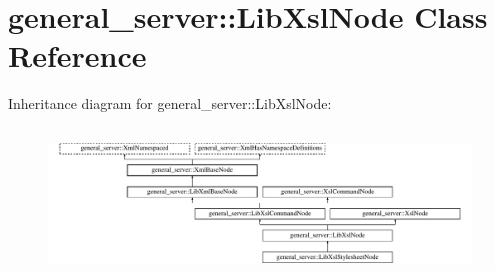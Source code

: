 \hypertarget{classgeneral__server_1_1LibXslNode}{\section{general\-\_\-server\-:\-:\-Lib\-Xsl\-Node \-Class \-Reference}
\label{classgeneral__server_1_1LibXslNode}
}
\-Inheritance diagram for general\-\_\-server\-:\-:\-Lib\-Xsl\-Node\-:\begin{figure}[H]
\begin{center}
\leavevmode
\includegraphics[height=3.985765cm]{classgeneral__server_1_1LibXslNode}
\end{center}
\end{figure}
